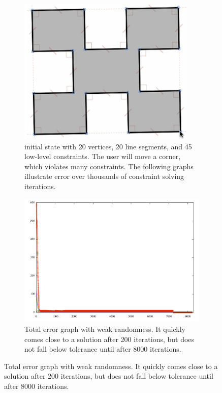 \begin{landscape}
\begin{figure}
  \centering
  \begin{subfigure}[t]{0.6\textwidth}
    \centering
    \includegraphics[width=0.8\linewidth]{img/jessica-constraint-example.png}
    \caption{initial state with 20 vertices, 20 line segments,
      and 45 low-level constraints. The user will move a corner, which
      violates many constraints. The following graphs illustrate error
      over thousands of constraint solving iterations.}
    \label{fig:jessica-initial}
  \end{subfigure}
  \hspace{0.03\textwidth}
  \begin{subfigure}[t]{0.6\textwidth}
    \centering
    \includegraphics[width=0.8\linewidth]{img/jessica-norandom.png}
    \caption{Total error graph with weak randomness. It quickly comes
      close to a solution after 200 iterations, but does not fall
      below tolerance until after 8000 iterations.}
    \label{fig:jessica-norandom}
  \end{subfigure}


\end{figure}
\end{landscape}
